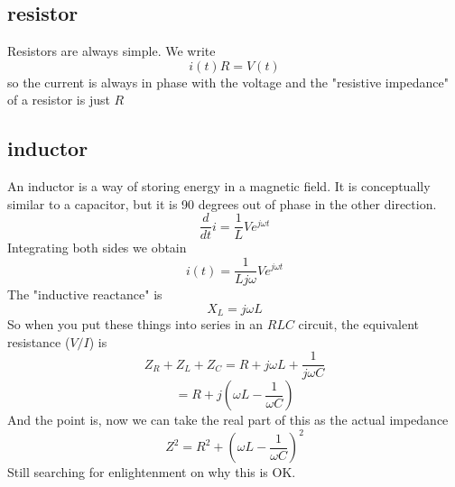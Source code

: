 \documentclass[11pt, oneside]{article}   	%
\begin{document}
\subsection*{resistor}
Resistors are always simple.  We write
\[ i(t) R = V(t) \]
so the current is always in phase with the voltage and the "resistive impedance" of a resistor is just $R$
\subsection*{inductor}
An inductor is a way of storing energy in a magnetic field.  It is conceptually similar to a capacitor, but it is 90 degrees out of phase in the other direction.
\[ \frac{d}{dt} i = \frac{1}{L} V e^{j\omega t}  \]
Integrating both sides we obtain
\[ i(t) = \frac{1}{Lj\omega} V e^{j\omega t}  \]
The "inductive reactance" is 
\[ X_L = j \omega L \]
So when you put these things into series in an $RLC$ circuit, the equivalent resistance ($V/I$) is 
\[ Z_R + Z_L + Z_C = R + j \omega L +  \frac{1}{j \omega C}  \]
\[ = R + j (\omega L -  \frac{1}{\omega C} ) \]
And the point is, now we can take the real part of this as the actual impedance
\[ Z^2 = R^2 + (\omega L -  \frac{1}{\omega C} )^2 \]
Still searching for enlightenment on why this is OK.
\end{document}
